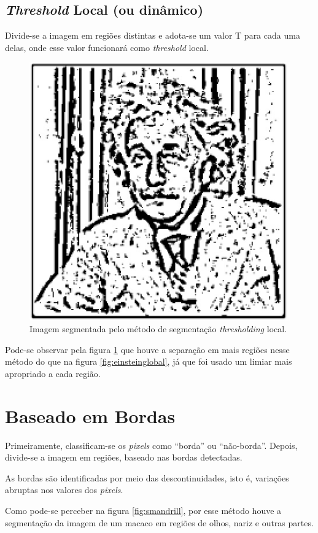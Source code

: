 \subsection{\textit{Threshold} Local (ou dinâmico)}
Divide-se a imagem em regiões distintas e adota-se um valor T para cada uma delas, onde esse valor funcionará como \textit{threshold} local. 

  \begin{figure}[!htb]
       \begin{center}  
          \includegraphics[width=0.3\columnwidth]{img/einstein-localthresholding-adaptivegausian.jpg}
           \caption{\label{fig:einsteinlocal}Imagem segmentada pelo método de segmentação \textit{thresholding} local.}
       \end{center}
   \end{figure}
   
   Pode-se observar pela figura \ref{fig:einsteinlocal} que houve a separação em mais regiões nesse método do que na figura \ref{fig:einsteinglobal}, já que foi usado um limiar mais apropriado a cada região.

\section{Baseado em Bordas}
Primeiramente, classificam-se os \textit{pixels} como “borda” ou “não-borda”.
Depois, divide-se a imagem em regiões, baseado nas bordas detectadas.

As bordas são identificadas por meio das descontinuidades, isto é, variações abruptas nos valores dos \textit{pixels}. 

Como pode-se perceber na figura \ref{fig:smandrill}, por esse método houve a segmentação da imagem de um macaco em regiões de olhos, nariz e outras partes. 

